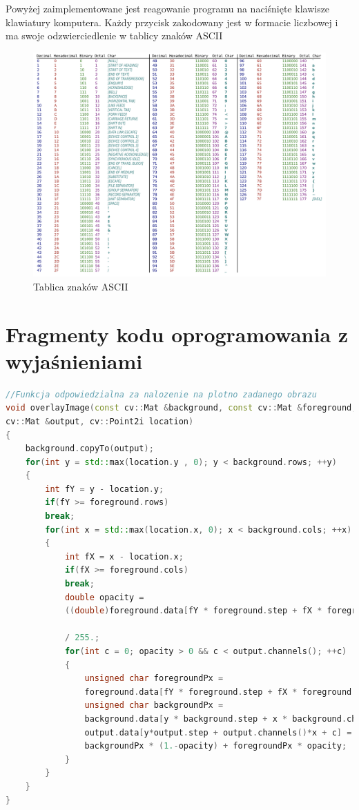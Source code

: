 \documentclass{article}
\begin{document}
Powyżej zaimplementowane jest reagowanie programu na naciśnięte klawisze klawiatury komputera. Każdy przycisk zakodowany jest w formacie liczbowej i ma swoje odzwierciedlenie w tablicy znaków ASCII
\begin{figure}
	\centering
	\includegraphics[width=15cm]{ascii}
	\caption{Tablica znaków ASCII}
\end{figure}

\newpage

\section*{\textbf{Fragmenty kodu oprogramowania z wyjaśnieniami} }

\begin{lstlisting}[language=C++, caption=Nakładanie obrazu do kolorowania]
//Funkcja odpowiedzialna za nalozenie na plotno zadanego obrazu
void overlayImage(const cv::Mat &background, const cv::Mat &foreground, 
cv::Mat &output, cv::Point2i location)
{
	background.copyTo(output);
	for(int y = std::max(location.y , 0); y < background.rows; ++y)
	{
		int fY = y - location.y;
		if(fY >= foreground.rows)
		break;
		for(int x = std::max(location.x, 0); x < background.cols; ++x)
		{
			int fX = x - location.x;
			if(fX >= foreground.cols)
			break;
			double opacity =
			((double)foreground.data[fY * foreground.step + fX * foreground.channels() + 3])
			
			/ 255.;
			for(int c = 0; opacity > 0 && c < output.channels(); ++c)
			{
				unsigned char foregroundPx =
				foreground.data[fY * foreground.step + fX * foreground.channels() + c];
				unsigned char backgroundPx =
				background.data[y * background.step + x * background.channels() + c];
				output.data[y*output.step + output.channels()*x + c] =
				backgroundPx * (1.-opacity) + foregroundPx * opacity;
			}
		}
	}
}
\end{lstlisting}
\end{document}
